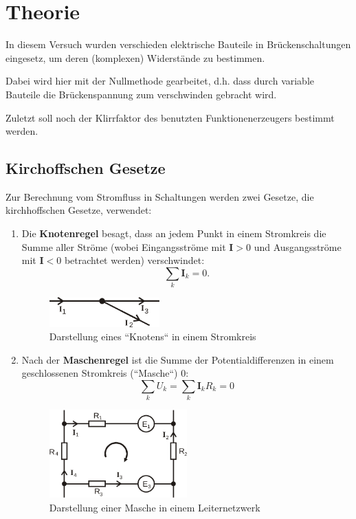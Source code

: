 \section{Theorie}
\label{sec:Theorie}

In diesem Versuch wurden verschieden elektrische Bauteile in Brückenschaltungen
eingesetz, um deren (komplexen) Widerstände zu bestimmen.

Dabei wird hier mit der Nullmethode gearbeitet, d.h. dass durch variable Bauteile
die Brückenspannung zum verschwinden gebracht wird.

Zuletzt soll noch der Klirrfaktor des benutzten Funktionenerzeugers bestimmt werden.

\subsection{Kirchoffschen Gesetze}
\label{sec:kirchhoff}
Zur Berechnung vom Stromfluss in Schaltungen werden zwei Gesetze, die
kirchhoffschen Gesetze, verwendet:
\begin{enumerate}
	\item Die \textbf{Knotenregel} besagt, dass an jedem Punkt in einem Stromkreis
		die Summe aller Ströme (wobei Eingangsströme mit $\mathbf{I} > 0$ und
		Ausgangsströme mit $\mathbf{I} < 0$ betrachtet werden) verschwindet:
		\begin{equation}
			\sum_k \mathbf{I}_k = 0.
			\label{eqn:knotenregel}
		\end{equation}
		\begin{figure}[H]
			\centering
			\includegraphics[width=0.4\textwidth]{bilder/knotenregel.png}
			\caption{Darstellung eines ``Knotens`` in einem Stromkreis}
			\label{fig:knotenregel}
		\end{figure}
	\item Nach der \textbf{Maschenregel} ist die Summe der Potentialdifferenzen
		in einem geschlossenen Stromkreis (``Masche``) 0:
		\begin{equation}
			\sum_k U_k = \sum_k \mathbf{I}_k R_k= 0
			\label{eqn:maschenregel}
		\end{equation}
		\begin{figure}[H]
			\centering
			\includegraphics[width=0.5\textwidth]{bilder/maschenregel.png}
			\caption{Darstellung einer Masche in einem Leiternetzwerk}
			\label{fig:maschenregel}
		\end{figure}
\end{enumerate}

